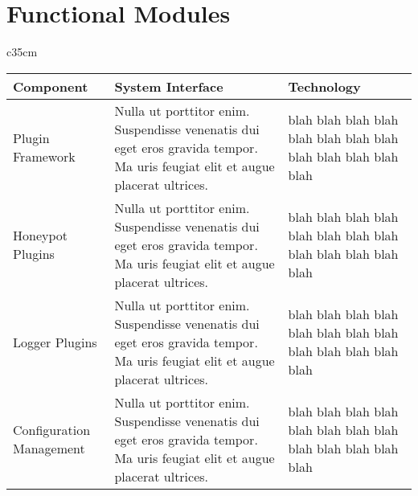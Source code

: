 \section*{\color{NavyBlue}Functional Modules}

\begin{wraptable}{c}{35cm}
\begin{center}
\begin{tabularx}{\linewidth}{X | X | X}
\toprule
\textbf{Component} & \textbf{System Interface} & \textbf{Technology} \\
\midrule
Plugin Framework & Nulla ut porttitor enim. Suspendisse venenatis dui eget eros gravida tempor. Ma uris feugiat elit et augue placerat ultrices. &  blah blah blah blah blah blah blah blah blah blah blah blah blah \\ \hline
Honeypot Plugins & Nulla ut porttitor enim. Suspendisse venenatis dui eget eros gravida tempor. Ma uris feugiat elit et augue placerat ultrices. &  blah blah blah blah blah blah blah blah blah blah blah blah blah \\ \hline
Logger Plugins & Nulla ut porttitor enim. Suspendisse venenatis dui eget eros gravida tempor. Ma uris feugiat elit et augue placerat ultrices. &  blah blah blah blah blah blah blah blah blah blah blah blah blah \\ \hline
Configuration Management & Nulla ut porttitor enim. Suspendisse venenatis dui eget eros gravida tempor. Ma uris feugiat elit et augue placerat ultrices. &  blah blah blah blah blah blah blah blah blah blah blah blah blah \\
\bottomrule
\end{tabularx}
\end{center}
\end{wraptable}
